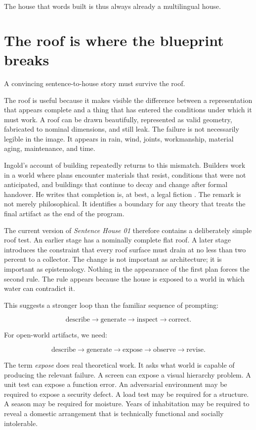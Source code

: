 \documentclass[11pt]{article}
\begin{document}
The house that words built is thus always already a multilingual house.

\section{The roof is where the blueprint breaks}

A convincing sentence-to-house story must survive the roof.

The roof is useful because it makes visible the difference between a representation that appears complete and a thing that has entered the conditions under which it must work. A roof can be drawn beautifully, represented as valid geometry, fabricated to nominal dimensions, and still leak. The failure is not necessarily legible in the image. It appears in rain, wind, joints, workmanship, material aging, maintenance, and time.

Ingold's account of building repeatedly returns to this mismatch. Builders work in a world where plans encounter materials that resist, conditions that were not anticipated, and buildings that continue to decay and change after formal handover. He writes that completion is, at best, a legal fiction \citep[47--48]{ingold2013making}. The remark is not merely philosophical. It identifies a boundary for any theory that treats the final artifact as the end of the program.

The current version of \emph{Sentence House 01} therefore contains a deliberately simple roof test. An earlier stage has a nominally complete flat roof. A later stage introduces the constraint that every roof surface must drain at no less than two percent to a collector. The change is not important as architecture; it is important as epistemology. Nothing in the appearance of the first plan forces the second rule. The rule appears because the house is exposed to a world in which water can contradict it.

This suggests a stronger loop than the familiar sequence of prompting:

\[
\text{describe} \rightarrow \text{generate} \rightarrow \text{inspect} \rightarrow \text{correct}.
\]

For open-world artifacts, we need:

\[
\text{describe} \rightarrow \text{generate} \rightarrow \text{expose} \rightarrow \text{observe} \rightarrow \text{revise}.
\]

The term \emph{expose} does real theoretical work. It asks what world is capable of producing the relevant failure. A screen can expose a visual hierarchy problem. A unit test can expose a function error. An adversarial environment may be required to expose a security defect. A load test may be required for a structure. A season may be required for moisture. Years of inhabitation may be required to reveal a domestic arrangement that is technically functional and socially intolerable.
\end{document}
